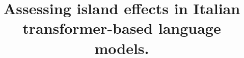 \documentclass[a4paper, 12pt, twoside,openany]{book}
\begin{document}

\title{Assessing island effects in Italian transformer-based language models.}
\end{document}
